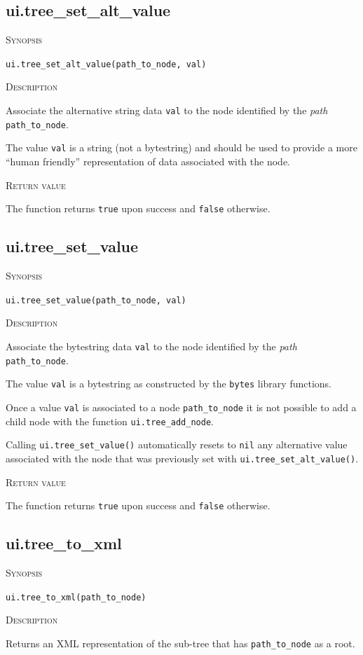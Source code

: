 \documentclass[11pt]{report}
\newcommand{\mansection}[1]{\vspace{0.5em}\par\noindent\textsc{#1}\vspace{0.5em}\par}
\newcommand{\syn}[1]{\texttt{#1}}
\begin{document}
\subsection{ui.tree\_set\_alt\_value}

\mansection{Synopsis}
\syn{ui.tree\_set\_alt\_value(path\_to\_node, val)}

\mansection{Description}
  Associate the alternative string data \syn{val} to the node identified by the \emph{path} 
  \syn{path\_to\_node}. 

  The value \syn{val} is a string (not a bytestring) and should be used to provide a more 
  ``human friendly'' representation of data associated with the node.

\mansection{Return value}
  The function returns \syn{true} upon success and \syn{false} otherwise.


\subsection{ui.tree\_set\_value}

\mansection{Synopsis}
\syn{ui.tree\_set\_value(path\_to\_node, val)}

\mansection{Description}
  Associate the bytestring data \syn{val} to the node identified by the \emph{path} 
  \syn{path\_to\_node}.

  The value \syn{val} is a bytestring as constructed by the \syn{bytes} library functions.

  Once a value \syn{val} is associated to a node \syn{path\_to\_node} 
  it is not possible to add a child node with the function \syn{ui.tree\_add\_node}.

  Calling \syn{ui.tree\_set\_value()} automatically resets to \syn{nil} any alternative value
  associated with the node that was previously set with \syn{ui.tree\_set\_alt\_value()}.

\mansection{Return value}
  The function returns \syn{true} upon success and \syn{false} otherwise.


\subsection{ui.tree\_to\_xml}

\mansection{Synopsis}
\syn{ui.tree\_to\_xml(path\_to\_node)}

\mansection{Description}
  Returns an XML representation of the sub-tree that has \syn{path\_to\_node} 
  as a root.
	  
\end{document}
